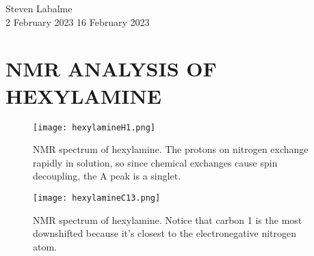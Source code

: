 \documentclass[../labs.tex]{subfiles}
\begin{document}
\noindent Steven Labalme\\
2 February 2023\hfill
16 February 2023

\section{NMR ANALYSIS OF HEXYLAMINE}
\begin{figure}[H]
    \centering
    \texttt{[image: hexylamineH1.png]}
    \caption{ NMR spectrum of hexylamine. The protons on nitrogen exchange rapidly in solution, so since chemical exchanges cause spin decoupling, the A peak is a singlet.}
    \label{fig:hexylamineH1}
\end{figure}

\begin{figure}[H]
    \centering
    \texttt{[image: hexylamineC13.png]}
    \caption{ NMR spectrum of hexylamine. Notice that carbon 1 is the most downshifted because it's closest to the electronegative nitrogen atom.}
    \label{fig:hexylamineC13}
\end{figure}
\end{document}
